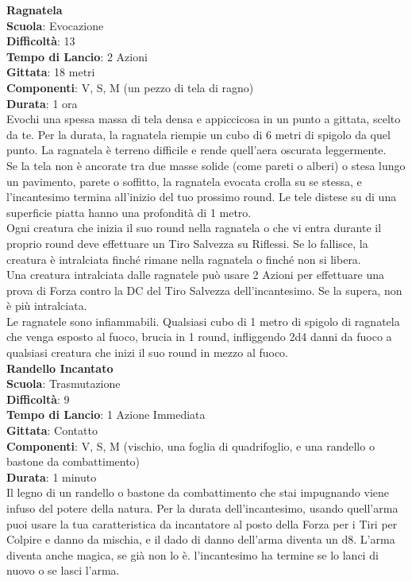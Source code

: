 \begin{multicols}{2}
\medskip\textbf{Ragnatela}\\
\textbf{Scuola}: Evocazione\\
\textbf{Difficoltà}:  13\\
\textbf{Tempo di Lancio}: 2 Azioni\\
\textbf{Gittata}: 18 metri\\
\textbf{Componenti}: V, S, M (un pezzo di tela di ragno)\\
\textbf{Durata}: 1 ora\\
Evochi una spessa massa di tela densa e appiccicosa in un punto a gittata, scelto da te. Per la durata, la ragnatela riempie un cubo di 6 metri di spigolo da quel punto. La ragnatela è terreno difficile e rende quell'aera oscurata leggermente.\\
Se la tela non è ancorate tra due masse solide (come pareti o alberi) o stesa lungo un pavimento, parete o soffitto, la ragnatela evocata crolla su se stessa, e l'incantesimo termina all'inizio del tuo prossimo round. Le tele distese su di una superficie piatta hanno una profondità di 1 metro.\\
Ogni creatura che inizia il suo round nella ragnatela o che vi entra durante il proprio round deve effettuare un Tiro Salvezza su Riflessi. Se lo fallisce, la creatura è intralciata finché rimane nella ragnatela o finché non si libera.\\
Una creatura intralciata dalle ragnatele può usare 2 Azioni per effettuare una prova di Forza contro la DC del Tiro Salvezza dell'incantesimo. Se la supera, non è più intralciata.\\
Le ragnatele sono infiammabili. Qualsiasi cubo di 1 metro di spigolo di ragnatela che venga esposto al fuoco, brucia in 1 round, infliggendo 2d4 danni da fuoco a qualsiasi creatura che inizi il suo round in mezzo al fuoco.\\

\medskip\textbf{Randello Incantato}\\
\textbf{Scuola}: Trasmutazione\\
\textbf{Difficoltà}:  9\\
\textbf{Tempo di Lancio}: 1 Azione Immediata\\
\textbf{Gittata}: Contatto\\
\textbf{Componenti}: V, S, M (vischio, una foglia di quadrifoglio, e una randello o bastone da combattimento)\\
\textbf{Durata}: 1 minuto\\
Il legno di un randello o bastone da combattimento che stai impugnando viene infuso del potere della natura. Per la durata dell'incantesimo, usando quell'arma puoi usare la tua caratteristica da incantatore al posto della Forza per i Tiri per Colpire e danno da mischia, e il dado di danno dell'arma diventa un d8. L’arma diventa anche magica, se già non lo è. l'incantesimo ha termine se lo lanci di nuovo o se lasci l’arma.


\end{multicols}

